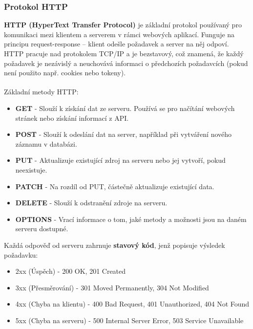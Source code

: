 \subsubsection{Protokol HTTP}
\textbf{HTTP (HyperText Transfer Protocol)} je základní protokol používaný pro komunikaci mezi klientem a serverem v rámci webových aplikací. Funguje na principu request-response – klient odešle požadavek a server na něj odpoví. HTTP pracuje nad protokolem TCP/IP a je bezstavový, což znamená, že každý požadavek je nezávislý a neuchovává informaci o předchozích požadavcích (pokud není použito např. cookies nebo tokeny). \\\\
Základní metody HTTP: \cite{http_methods}
\begin{itemize}
    \item \textbf{GET} - Slouží k získání dat ze serveru. Používá se pro načítání webových stránek nebo získání informací z API.
    \item \textbf{POST} - Slouží k odeslání dat na server, například při vytváření nového záznamu v databázi.
    \item \textbf{PUT} - Aktualizuje existující zdroj na serveru nebo jej vytvoří, pokud neexistuje.
    \item \textbf{PATCH} - Na rozdíl od PUT, částečně aktualizuje existující data.
    \item \textbf{DELETE} - Slouží k odstranění zdroje na serveru.
    \item \textbf{OPTIONS} - Vrací informace o tom, jaké metody a možnosti jsou na daném serveru dostupné.
\end{itemize}
Každá odpověď od serveru zahrnuje \textbf{stavový kód}, jenž popisuje výsledek požadavku: \cite{http_codes}
\begin{itemize}
    \item 2xx (Úspěch) - 200 OK, 201 Created
    \item 3xx (Přesměrování) - 301 Moved Permanently, 304 Not Modified
    \item 4xx (Chyba na klientu) - 400 Bad Request, 401 Unauthorized, 404 Not Found
    \item 5xx (Chyba na serveru) - 500 Internal Server Error, 503 Service Unavailable
\end{itemize}
